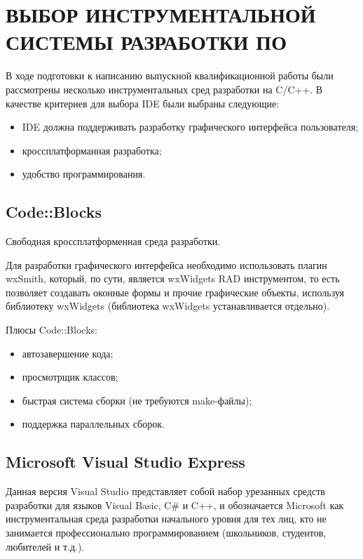 \chapter{ВЫБОР ИНСТРУМЕНТАЛЬНОЙ СИСТЕМЫ РАЗРАБОТКИ ПО}
	
	В ходе подготовки к написанию выпускной квалификационной работы были рассмотрены несколько инструментальных сред разработки на C/C++. В качестве критериев для выбора IDE были выбраны следующие:
	
	\begin{itemize}
		\item IDE должна поддерживать разработку графического интерфейса пользователя;
		\item кроссплатформанная разработка;
		\item удобство программирования.
	\end{itemize}
	
	\section{Code::Blocks}
	
	Свободная кроссплатформенная среда разработки. 
	
	Для разработки графического интерфейса необходимо использовать плагин wxSmith, который, по сути, является  wxWidgets
	RAD инструментом, то есть позволяет создавать оконные формы и прочие графические объекты, используя библиотеку wxWidgets (библиотека wxWidgets устанавливается отдельно). 
	
	Плюсы Code::Blocks:
	
	 \begin{itemize}
		 \item автозавершение кода;
		 \item просмотрщик классов;
		 \item быстрая система сборки (не требуются make-файлы);
		 \item поддержка параллельных сборок.
	 \end{itemize}
	 
	\section{Microsoft Visual Studio Express}
	
	
	Данная версия Visual Studio представляет собой набор урезанных средств
	разработки для языков Visual Basic, C\# и C++, и обозначается Microsoft как инструментальная среда разработки начального
	уровня для тех лиц, кто не занимается профессионально программированием
	(школьников, студентов, любителей и т.д.).
	
